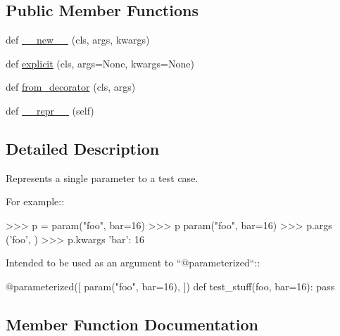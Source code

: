 \subsection*{Public Member Functions}
\begin{DoxyCompactItemize}
\item 
def \hyperlink{classnumpy_1_1testing_1_1__private_1_1parameterized_1_1param_a3f7143d12739446a240b1f68d40fe51c}{\+\_\+\+\_\+new\+\_\+\+\_\+} (cls, args, kwargs)
\item 
def \hyperlink{classnumpy_1_1testing_1_1__private_1_1parameterized_1_1param_a06200799a1c1564ae7f057f90399014c}{explicit} (cls, args=None, kwargs=None)
\item 
def \hyperlink{classnumpy_1_1testing_1_1__private_1_1parameterized_1_1param_add4062293c0eaa524611c9b37e078938}{from\+\_\+decorator} (cls, args)
\item 
def \hyperlink{classnumpy_1_1testing_1_1__private_1_1parameterized_1_1param_addeddd4a29f275432fc997ddeeee3849}{\+\_\+\+\_\+repr\+\_\+\+\_\+} (self)
\end{DoxyCompactItemize}


\subsection{Detailed Description}
\begin{DoxyVerb}Represents a single parameter to a test case.

    For example::

        >>> p = param("foo", bar=16)
        >>> p
        param("foo", bar=16)
        >>> p.args
        ('foo', )
        >>> p.kwargs
        {'bar': 16}

    Intended to be used as an argument to ``@parameterized``::

        @parameterized([
            param("foo", bar=16),
        ])
        def test_stuff(foo, bar=16):
            pass\end{DoxyVerb}
 

\subsection{Member Function Documentation}
\mbox{\label{classnumpy_1_1testing_1_1__private_1_1parameterized_1_1param_a3f7143d12739446a240b1f68d40fe51c}} 
